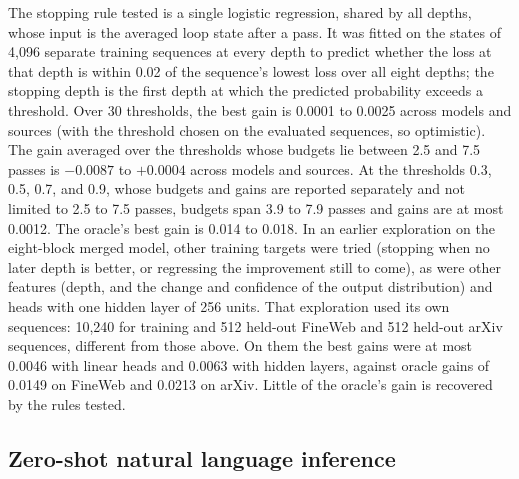 \documentclass[11pt]{article}
\begin{document}
The stopping rule tested is a single logistic regression, shared by all depths, whose input is the averaged loop state after a pass. It
was fitted on the states of 4,096 separate training sequences at every depth to predict whether the loss at that depth is within 0.02 of the
sequence's lowest loss over all eight depths; the stopping depth is the first depth at which the predicted probability
exceeds a threshold. Over 30 thresholds, the best gain is 0.0001 to 0.0025 across models and sources (with the threshold chosen on the evaluated sequences,
so optimistic). The gain averaged over the thresholds whose budgets lie between 2.5 and 7.5 passes is $-0.0087$ to $+0.0004$ across models and
sources. At the thresholds 0.3, 0.5, 0.7, and 0.9, whose budgets and gains are reported separately and
not limited to 2.5 to 7.5 passes, budgets span 3.9 to 7.9 passes and gains are at most 0.0012. The oracle's best gain is 0.014 to 0.018. In an earlier exploration on the
eight-block merged model, other training targets were tried (stopping when no later depth is better, or regressing the improvement still to
come), as were other features (depth, and the change and confidence of the output distribution) and heads with one hidden layer of 256 units.
That exploration used its own sequences: 10,240 for training and 512 held-out FineWeb and 512 held-out arXiv sequences, different from those
above. On them the best gains were at most 0.0046 with linear heads and 0.0063 with hidden layers, against oracle gains of 0.0149 on FineWeb and
0.0213 on arXiv. Little of the oracle's gain is recovered by the rules tested.

\subsection{Zero-shot natural language inference}
\label{sec:nli}
\end{document}
